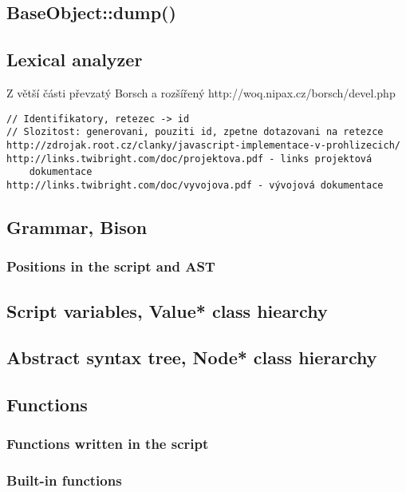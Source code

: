 \documentclass[11pt,twoside,a4paper]{book}
\begin{document}
\subsection{BaseObject::dump()}

\subsection{Lexical analyzer}

Z větší části převzatý Borsch a rozšířený
http://woq.nipax.cz/borsch/devel.php

\begin{verbatim}
// Identifikatory, retezec -> id
// Slozitost: generovani, pouziti id, zpetne dotazovani na retezce
http://zdrojak.root.cz/clanky/javascript-implementace-v-prohlizecich/
http://links.twibright.com/doc/projektova.pdf - links projektová
	dokumentace
http://links.twibright.com/doc/vyvojova.pdf - vývojová dokumentace
\end{verbatim}


\subsection{Grammar, Bison}

\subsubsection{Positions in the script and AST}


\subsection{Script variables, Value* class hiearchy}

\subsection{Abstract syntax tree, Node* class hierarchy}


\subsection{Functions}

\subsubsection{Functions written in the script}

\subsubsection{Built-in functions}
\end{document}
